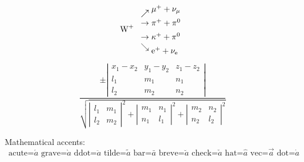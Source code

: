 \documentclass{article}
\begin{document}
\[
\mbox{W}^+\
\begin{array}{l}
\nearrow\raise5pt\hbox{$\mu^+ + \nu_{\mu}$}\\
\rightarrow         \pi^+ +\pi^0         \\[5pt]
\rightarrow \kappa^+ +\pi^0              \\
\searrow\lower5pt\hbox{$\mathrm{e}^+ 
          +\nu_{\scriptstyle\mathrm{e}}$}
\end{array}
\]

\[
\frac{\pm
\left|\begin{array}{ccc}
x_1-x_2  & y_1-y_2 & z_1-z_2 \\
l_1      & m_1     & n_1     \\
l_2      & m_2     & n_2
\end{array}\right|}{
\sqrt{\left|\begin{array}{cc}l_1&m_1\\
l_2&m_2\end{array}\right|^2
+     \left|\begin{array}{cc}m_1&n_1\\
n_1&l_1\end{array}\right|^2
+     \left|\begin{array}{cc}m_2&n_2\\
n_2&l_2\end{array}\right|^2}}
\]

Mathematical accents:
\[
\mbox{ acute=} \acute{a}
\mbox{ grave=}\grave{a}
\mbox{ ddot=}\ddot {a}
\mbox{ tilde=}\tilde{a}
\mbox{ bar=}\bar  {a}
\mbox{ breve=}\breve{a}
\mbox{ check=}\check{a}
\mbox{ hat=}\hat  {a}
\mbox{ vec=}\vec  {a}
\mbox{ dot=}\dot  {a}
\]
\end{document}
